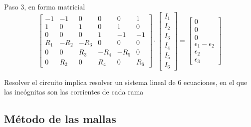 \documentclass[aspectratio=169, xcolor={usenames,svgnames,dvipsnames}]{beamer}
\begin{document}
\begin{frame}{Paso 3, en forma matricial}
    \begin{equation*}
      \begin{bmatrix}
        -1 & -1 & 0 & 0 & 0 & 1\\
        1 & 0 & 1 & 0 & 1 & 0\\
        0 & 0 & 0 & 1 & -1 & -1\\
        R_1 & -R_2 & - R_3 & 0 & 0 & 0\\
        0 & 0 & R_3 & - R_4 & - R_5 & 0\\
        0 & R_2 & 0 & R_4 & 0 & R_6
      \end{bmatrix} \cdot %
      \begin{bmatrix}
        I_1\\
        I_2\\
        I_3\\
        I_4\\
        I_5\\
        I_6    
      \end{bmatrix} = %
      \begin{bmatrix}
        0\\
        0\\
        0\\
        \epsilon_1 - \epsilon_2\\
        \epsilon_2\\
        \epsilon_3
      \end{bmatrix}
    \end{equation*}

    \vspace{2mm}
    \begin{center}
        \begin{minipage}{0.8\linewidth} 
            \begin{center}
                Resolver el circuito implica resolver un sistema lineal de \alert{6 ecuaciones}, en el que las incógnitas son las corrientes de cada rama
            \end{center} 
        \end{minipage}
    \end{center}    
\end{frame}


\subsection{Método de las mallas}
\end{document}
